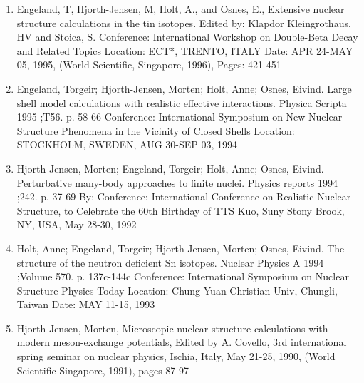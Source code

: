 \documentclass[a4wide,10pt]{article}
\begin{document}
\begin{enumerate}
\item Engeland, T, Hjorth-Jensen, M, Holt, A., and Osnes, E.,  Extensive nuclear structure calculations in the tin isotopes. Edited by: Klapdor Kleingrothaus, HV and Stoica, S. Conference: International Workshop on Double-Beta Decay and Related Topics Location: ECT*, TRENTO, ITALY Date: APR 24-MAY 05, 1995, (World Scientific, Singapore, 1996), Pages: 421-451

\item Engeland, Torgeir; Hjorth-Jensen, Morten; Holt, Anne; Osnes, Eivind.  Large shell model calculations with realistic effective interactions. Physica Scripta 1995 ;T56. p. 58-66 Conference: International Symposium on New Nuclear Structure Phenomena in the Vicinity of Closed Shells Location: STOCKHOLM, SWEDEN, AUG 30-SEP 03, 1994 

\item Hjorth-Jensen, Morten; Engeland, Torgeir; Holt, Anne; Osnes, Eivind.  Perturbative many-body approaches to finite nuclei. Physics reports 1994 ;242. p. 37-69 By: Conference: International Conference on Realistic Nuclear Structure, to Celebrate the 60th Birthday of TTS Kuo, Suny Stony Brook, NY, USA,  May 28-30, 1992

\item Holt, Anne; Engeland, Torgeir; Hjorth-Jensen, Morten; Osnes, Eivind.  The structure of the neutron deficient Sn isotopes. Nuclear Physics A 1994 ;Volume 570. p. 137c-144c Conference: International Symposium on Nuclear Structure Physics Today Location: Chung Yuan Christian Univ, Chungli, Taiwan Date: MAY 11-15, 1993 

\item Hjorth-Jensen, Morten,  Microscopic nuclear-structure calculations with modern meson-exchange potentials, Edited by A. Covello, 3rd international spring seminar on nuclear physics, Ischia, Italy, May 21-25, 1990, (World Scientific Singapore, 1991), pages 87-97 
\end{enumerate}

\end{document}

